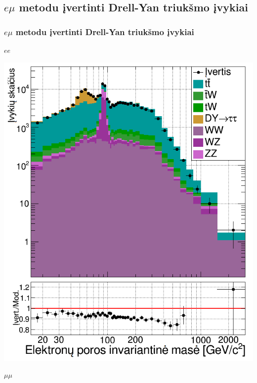 \documentclass[xcolor=dvipsnames]{beamer}
\newcommand{\emu}{\mathit{e}\mu}
\newcommand{\ee}{\mathit{ee}}
\newcommand{\mumu}{\mu\mu}
\begin{document}
\begin{frame}
	\section{$\emu$ metodu įvertinti Drell-Yan triukšmo įvykiai}
	\frametitle{$\emu$ metodu įvertinti Drell-Yan triukšmo įvykiai}
	\begin{minipage}{0.46\textwidth}
		\centering
		$\ee$ 
		
		\includegraphics[width=\linewidth]{eeMassEst_SMALL.png}
	\end{minipage}
	\hfill
	\begin{minipage}{0.46\textwidth}
		\centering
		$\mumu$
		

\end{minipage}
\end{frame}
\end{document}
